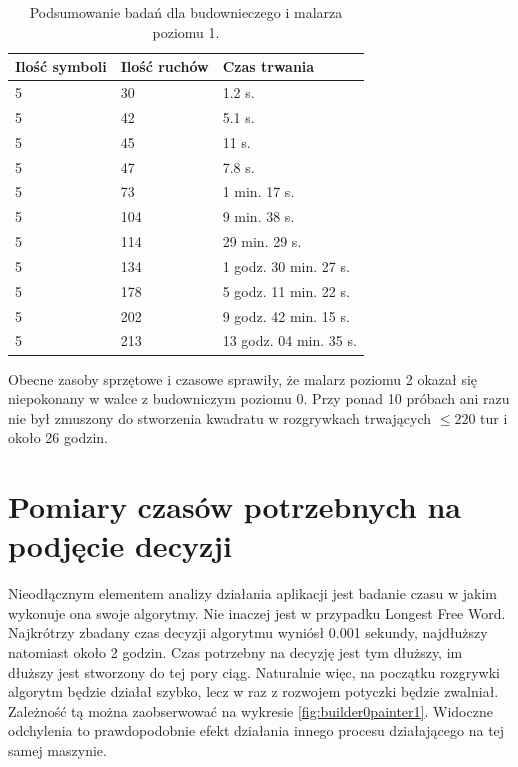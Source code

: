 \documentclass[document]{xmgr}
\begin{document}
\begin{table}[tbh]
    \centering
	\begin{tabular}{|l|l|l|} \hline
	Ilość symboli & Ilość ruchów & Czas trwania \\ \hline
	5 & 30 & 1.2 s. \\ \hline	
	5 & 42 & 5.1 s. \\ \hline
	5 & 45 & 11 s. \\ \hline	
	5 & 47 & 7.8 s. \\ \hline
	5 & 73 & 1 min. 17 s. \\ \hline
	5 & 104 & 9 min. 38 s. \\ \hline
	5 & 114 & 29 min. 29 s. \\ \hline
	5 & 134 & 1 godz. 30 min. 27 s.  \\ \hline
	5 & 178 & 5 godz. 11 min. 22 s. \\ \hline
	5 & 202 & 9 godz. 42 min. 15 s. \\ \hline
	5 & 213 & 13 godz. 04 min. 35 s. \\ \hline
	\end{tabular}
	\caption{Podsumowanie badań dla budownieczego i malarza poziomu 1.}
	\label{fig:builder1Painter1Table}
\end{table}


Obecne zasoby sprzętowe i czasowe sprawiły, że malarz poziomu 2 okazał się niepokonany w walce z budowniczym poziomu 0. Przy ponad 10 próbach ani razu nie był zmuszony do stworzenia kwadratu w rozgrywkach trwających $\leq 220$ tur i około 26 godzin.





\section{Pomiary czasów potrzebnych na podjęcie decyzji}
Nieodłącznym elementem analizy działania aplikacji jest badanie czasu w jakim wykonuje ona swoje algorytmy. Nie inaczej jest w przypadku Longest Free Word. Najkrótrzy zbadany czas decyzji algorytmu wyniósł 0.001 sekundy, najdłuższy natomiast około 2 godzin. Czas potrzebny na decyzję jest tym dłuższy, im dłuższy jest stworzony do tej pory ciąg. Naturalnie więc, na początku rozgrywki algorytm będzie działał szybko, lecz w raz z rozwojem potyczki będzie zwalniał. Zależność tą można zaobserwować na wykresie \ref{fig:builder0painter1}. Widoczne odchylenia to prawdopodobnie efekt działania innego procesu działającego na tej samej maszynie.
\end{document}
